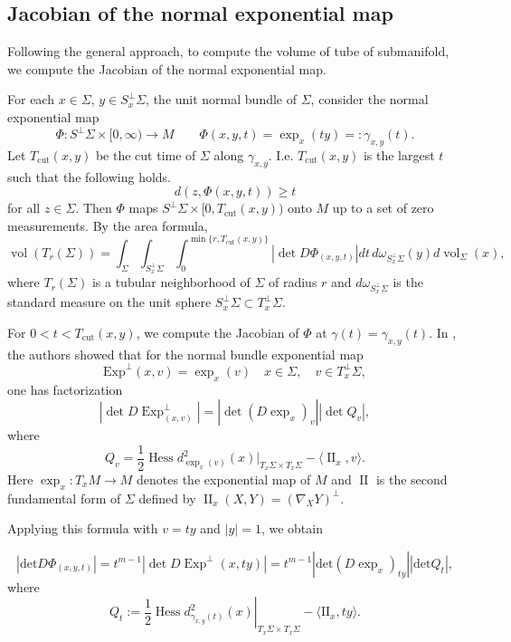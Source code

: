 \documentclass[psamsfonts]{amsart}
\theoremstyle{definition}
\theoremstyle{remark}
\numberwithin{equation}{section}
\begin{document}
    \subsection{Jacobian of the normal exponential map}
Following the general approach, to compute the volume of tube of submanifold, we compute the Jacobian of the normal exponential map.

For each $x \in \Sigma$,  $y \in S^\perp_x\Sigma$, the unit normal bundle of $\Sigma$, 
consider the normal exponential map
$$\Phi: S^\perp \Sigma \times [0,\infty) \to M \qquad \Phi(x,y,t) = \exp_{x}(ty) =:  \gamma_{x,y}(t).$$ 
Let $T_{\mathrm{cut}}(x,y)$ be the cut time of $\Sigma$ along $\gamma_{x,y}$. I.e. $T_{\mathrm{cut}}(x,y)$ is the largest $t$ such that the following holds.
\[ d(z, \Phi(x,y,t) ) \ge t
\]
for all $z \in \Sigma$. Then $\Phi$ maps $S^\perp \Sigma \times [0, T_{\mathrm{cut}}(x,y))$ onto $M$ up to a set of zero measurements. 
By the area formula,
$$\operatorname{vol}(T_r (\Sigma)) = \int_\Sigma \int_{S_x^\perp \Sigma} \int_0^{\min\{r, T_{\mathrm{cut}} (x,y)\}}|\operatorname{det} D\Phi_{(x,y,t)}|dt \, d\omega_{S_x^\perp \Sigma}(y) d{\operatorname{vol}}_{\Sigma}(x),$$
where $T_r (\Sigma)$ is a tubular neighborhood of $\Sigma$ of radius $r$ and $d\omega_{S_x^\perp \Sigma}$ is the standard measure on the unit sphere $S_x^\perp \Sigma \subset T^\perp_x \Sigma$.

For $0<t<T_{\mathrm{cut}}(x,y)$, we compute the Jacobian of $\Phi$ at $\gamma(t) = \gamma_{x,y}(t)$.
In \cite[Lemma 3.2]{Pan-Yi2026}, the authors showed that 
for the normal bundle exponential map 
$$\mathrm{Exp}^\perp(x,v)= \exp_x (v) \quad x \in \Sigma , \quad v \in T_x^\perp \Sigma,$$
one has factorization
$$|\operatorname{det} D \operatorname{Exp}^\perp_{(x,v)} | = |\operatorname{det} (D \exp_x )_{v} | |\operatorname{det} Q_v|,$$
where $$Q_v = \frac{1}{2} \operatorname{Hess} d^2_{\exp_x(v)}(x)|_{T_x \Sigma \times T_x \Sigma} - \langle \operatorname{II}_x, v\rangle.$$
Here $\exp_x:T_xM \to M$ denotes the exponential map of $M$ and $\operatorname{II}$ is the second fundamental form of $\Sigma$ defined by $\operatorname{II}_x(X,Y) = (\nabla_X Y)^\perp$.

Applying this formula with $v= ty$ and $|y| = 1$, we obtain 

\begin{equation}\label{eq:main factorization}
    |\mathrm{det} D\Phi_{(  x ,   y ,   t)}| = t^{m-1}|\operatorname{det} D \operatorname{Exp}^\perp(x,ty) | = t^{m-1}|\mathrm{det} (D\exp_{  x})_{  t  y}| | \mathrm{det} Q_t|,
\end{equation}
where 
\begin{equation}\label{definition of Qt}
    Q_t :=\left.\frac{1}{2} \operatorname{Hess} d^2_{\gamma_{  x ,   y }(  t)} (   x)\right|_{T_{  x} \Sigma \times T_{  x} \Sigma} - \langle \mathrm{II}_x ,    ty\rangle .
\end{equation}
\end{document}
